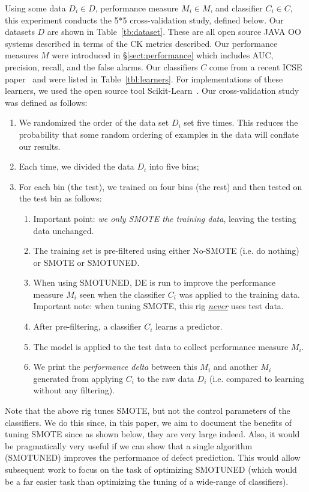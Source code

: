 \documentclass[10pt,conference]{IEEEtran}
\newcommand{\be}{\begin{enumerate}}
\newcommand{\ee}{\end{enumerate}}
\theoremstyle{break}
\theoremstyle{break}
\newcommand{\tion}[1]{{\S}\ref{sect:#1}}
\begin{document}
Using some data $D_i \in D$, performance measure $M_i \in M$, and classifier $C_i \in C$,
this experiment conducts the 5*5 cross-validation study, defined below.
Our datasets  $D$ are shown in  Table~\ref{tb:dataset}. These are all open source
JAVA OO systems described in terms of the CK metrics described. 
Our performance measures $M$ were introduced in \tion{performance}
which includes   AUC, precision, recall, and the  false alarms. 
Our classifiers
 $C$  come from a  recent ICSE paper~\cite{ghotra2015revisiting}
and were listed in  Table~\ref{tbl:learners}.
For  implementations 
of these learners,
we used  the open source tool
Scikit-Learn~\cite{pedregosa2011scikit}.
Our  cross-validation study~\cite{refaeilzadeh2009cross} was defined as follows:
\be
\item We randomized the order of the data set $D_i$ set five times. This reduces the probability
that some random ordering of examples in the data will conflate our results.
\item Each time, we divided the data $D_i$ into five bins;
\item For each bin (the test), we trained on four bins (the rest) and then tested
on the test bin as follows:
\be
\item
Important point: {\em we only SMOTE the training data},  leaving
the  testing data unchanged.
\item
The  training set is pre-filtered using either No-SMOTE (i.e. do nothing) or  SMOTE or SMOTUNED.  
\item
When using SMOTUNED, DE is  run to  improve
the performance measure $M_i$ seen when the classifier $C_i$ was applied to the training data.
Important note: when tuning SMOTE, this rig \underline{{\em never}} uses test data.
\item
After pre-filtering, a classifier $C_i$  learns a predictor.
\item
The model is applied to the test data to collect performance measure $M_i$. 
\item 
We print the {\em performance delta} between this $M_i$ and another  $M_i$
generated from applying $C_i$ to the raw data $D_i$ (i.e. compared to learning
without any filtering).
\ee
\ee


   
   
Note that the above rig tunes SMOTE, but not the control parameters of the classifiers.
We do this since, in this paper,  we aim to document the   benefits of tuning SMOTE since as shown below, they are very large indeed. Also, it would be  pragmatically very useful if we can show that a single algorithm (SMOTUNED)  improves the performance of defect prediction. This would allow
subsequent work to focus on the task of optimizing  SMOTUNED (which would be a far easier
task than optimizing the tuning of a wide-range of classifiers). 
 
\end{document}
